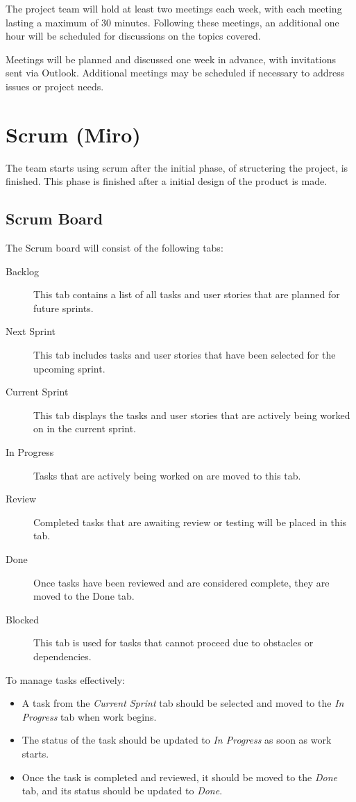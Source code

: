 \documentclass{projdoc}
\begin{document}
The project team will hold at least two meetings each week, with each meeting lasting
a maximum of 30 minutes. Following these meetings, an additional one hour will be
scheduled for discussions on the topics covered.

Meetings will be planned and discussed one week in advance, with invitations sent via
Outlook. Additional meetings may be scheduled if necessary to address issues or
project needs.

\section{Scrum (Miro)}

The team starts using scrum after the initial phase, of structering the project, is finished. This phase is finished after a initial design of the product is made.

\subsection{Scrum Board}

The Scrum board \autocite{miro:scrum-board} will consist of the following tabs:

\begin{description}
	\item[Backlog] This tab contains a list of all tasks and user stories that are
		planned for future sprints.
	\item[Next Sprint] This tab includes tasks and user stories that have been selected
		for the upcoming sprint.
	\item[Current Sprint] This tab displays the tasks and user stories that are
		actively being worked on in the current sprint.
	\item[In Progress] Tasks that are actively being worked on are moved to this tab.
	\item[Review] Completed tasks that are awaiting review or testing will be placed in
		this tab.
	\item[Done] Once tasks have been reviewed and are considered complete, they are
		moved to the Done tab.
	\item [Blocked] This tab is used for tasks that cannot proceed due to obstacles or
		dependencies.
\end{description}

To manage tasks effectively:

\begin{itemize}
	\item A task from the \emph{Current Sprint} tab should be selected and moved to the
		\emph{In Progress} tab when work begins.
	\item The status of the task should be updated to \emph{In Progress} as soon as
		work starts.
	\item Once the task is completed and reviewed, it should be moved to the
		\emph{Done} tab, and its status should be updated to \emph{Done}.
\end{itemize}
\end{document}
